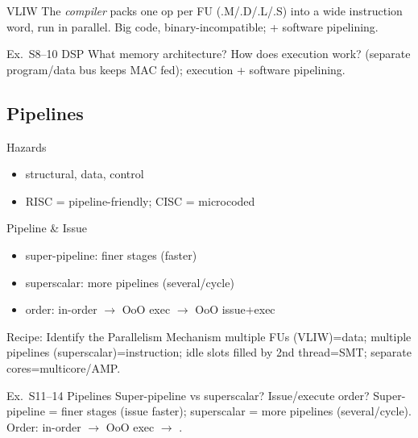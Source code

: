 \begin{definition}{VLIW}
    The \emph{compiler} packs one op per FU (.M/.D/.L/.S) into a wide instruction word, run in parallel. Big code, binary-incompatible; + software pipelining.
\end{definition}

\begin{example2}{Ex.\ S8--10 DSP}
    What memory architecture? How does execution work?
    \tcblower
     (separate program/data bus keeps MAC fed);  execution + software pipelining.
\end{example2}

\subsection{Pipelines}


\begin{definition}{Hazards}
    \begin{itemize}
        \item structural, data, control
        \item RISC = pipeline-friendly; CISC = microcoded
    \end{itemize}
\end{definition}

\begin{concept}{Pipeline \& Issue}
    \begin{itemize}
        \item super-pipeline: finer stages (faster)
        \item superscalar: more pipelines (several/cycle)
        \item order: in-order $\to$ OoO exec $\to$ OoO issue+exec
    \end{itemize}
\end{concept}

\multend

\begin{KR}{Recipe: Identify the Parallelism Mechanism}
    multiple FUs (VLIW)=data; multiple pipelines (superscalar)=instruction; idle slots filled by 2nd thread=SMT; separate cores=multicore/AMP.
\end{KR}

\begin{example2}{Ex.\ S11--14 Pipelines}
    Super-pipeline vs superscalar? Issue/execute order?
    \tcblower
    Super-pipeline = finer stages (issue faster); superscalar = more pipelines (several/cycle). Order: in-order $\to$ OoO exec $\to$ .
\end{example2}

